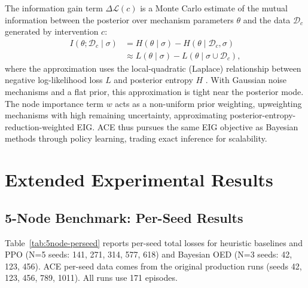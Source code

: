 The information gain term $\Delta\mathcal{L}(c)$ is a Monte Carlo estimate of the mutual information between the posterior over mechanism parameters $\theta$ and the data $\mathcal{D}_c$ generated by intervention $c$:
\begin{align}
I(\theta; \mathcal{D}_c \mid \sigma) &= H(\theta \mid \sigma) - H(\theta \mid \mathcal{D}_c, \sigma) \\
&\approx L(\theta \mid \sigma) - L(\theta \mid \sigma \cup \mathcal{D}_c),
\end{align}
where the approximation uses the local-quadratic (Laplace) relationship between negative log-likelihood loss $L$ and posterior entropy $H$ \citep{rainforth2024modern}. With Gaussian noise mechanisms and a flat prior, this approximation is tight near the posterior mode. The node importance term $w$ acts as a non-uniform prior weighting, upweighting mechanisms with high remaining uncertainty, approximating posterior-entropy-reduction-weighted EIG. ACE thus pursues the same EIG objective as Bayesian methods through policy learning, trading exact inference for scalability.

\section{Extended Experimental Results}
\label{app:experiments}

\subsection{5-Node Benchmark: Per-Seed Results}
\label{app:5node-detail}

Table~\ref{tab:5node-perseed} reports per-seed total losses for heuristic baselines and PPO (N=5 seeds: 141, 271, 314, 577, 618) and Bayesian OED (N=3 seeds: 42, 123, 456). ACE per-seed data comes from the original production runs (seeds 42, 123, 456, 789, 1011). All runs use 171 episodes.

